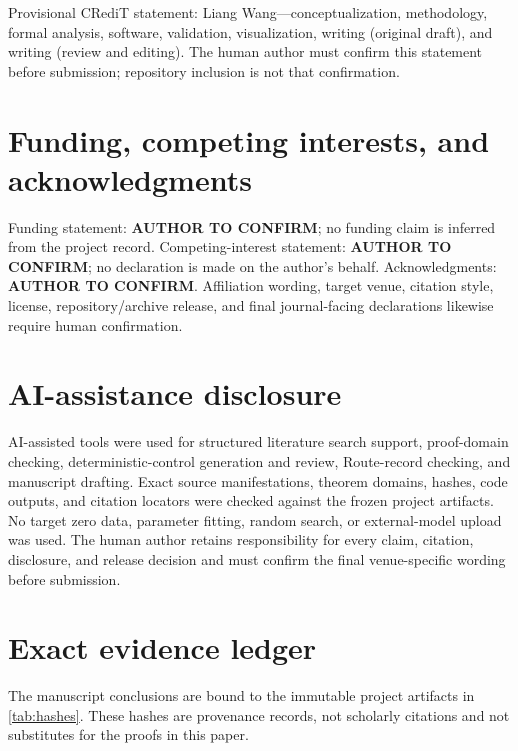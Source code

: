 \documentclass[11pt]{article}
\theoremstyle{definition}
\begin{document}
Provisional CRediT statement: Liang Wang---conceptualization, methodology, formal analysis, software, validation, visualization, writing (original draft), and writing (review and editing).  The human author must confirm this statement before submission; repository inclusion is not that confirmation.

\section*{Funding, competing interests, and acknowledgments}

Funding statement: \textbf{AUTHOR TO CONFIRM}; no funding claim is inferred from the project record.  Competing-interest statement: \textbf{AUTHOR TO CONFIRM}; no declaration is made on the author's behalf.  Acknowledgments: \textbf{AUTHOR TO CONFIRM}.  Affiliation wording, target venue, citation style, license, repository/archive release, and final journal-facing declarations likewise require human confirmation.

\section*{AI-assistance disclosure}

AI-assisted tools were used for structured literature search support, proof-domain checking, deterministic-control generation and review, Route-record checking, and manuscript drafting.  Exact source manifestations, theorem domains, hashes, code outputs, and citation locators were checked against the frozen project artifacts.  No target zero data, parameter fitting, random search, or external-model upload was used.  The human author retains responsibility for every claim, citation, disclosure, and release decision and must confirm the final venue-specific wording before submission.

\appendix
\section{Exact evidence ledger}
\label{app:ledger}

The manuscript conclusions are bound to the immutable project artifacts in \cref{tab:hashes}.  These hashes are provenance records, not scholarly citations and not substitutes for the proofs in this paper.
\end{document}
